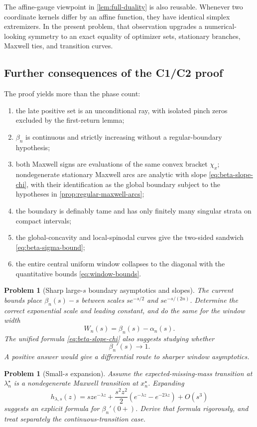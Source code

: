 \documentclass[11pt]{article}
\theoremstyle{plain}
\newtheorem{problem}[theorem]{Problem}
\theoremstyle{definition}
\theoremstyle{remark}
\begin{document}
The affine-gauge viewpoint in \cref{lem:full-duality} is also reusable.  Whenever two coordinate kernels differ by an affine function, they have identical simplex extremizers.  In the present problem, that observation upgrades a numerical-looking symmetry to an exact equality of optimizer sets, stationary branches, Maxwell ties, and transition curves.

\subsection{Further consequences of the C1/C2 proof}

The proof yields more than the phase count:
\begin{enumerate}[label=\textup{(\roman*)}]
\item the late positive set is an unconditional ray, with isolated pinch zeros excluded by the first-return lemma;
\item \(\beta_n\) is continuous and strictly increasing without a regular-boundary hypothesis;
\item both Maxwell signs are evaluations of the same convex bracket \(\chi_x\); nondegenerate stationary Maxwell arcs are analytic with slope \eqref{eq:beta-slope-chi}, with their identification as the global boundary subject to the hypotheses in \cref{prop:regular-maxwell-arcs};
\item the boundary is definably tame and has only finitely many singular strata on compact intervals;
\item the global-concavity and local-spinodal curves give the two-sided sandwich \eqref{eq:beta-sigma-bound};
\item the entire central uniform window collapses to the diagonal with the quantitative bounds \eqref{eq:window-bounds}.
\end{enumerate}

\begin{problem}[Sharp large-\(s\) boundary asymptotics and slopes]
The current bounds place \(\beta_n(s)-s\) between scales \(s e^{-s/2}\) and \(s e^{-s/(2n)}\).  Determine the correct exponential scale and leading constant, and do the same for the window width
\[
W_n(s)=\beta_n(s)-\alpha_n(s).
\]
The unified formula \eqref{eq:beta-slope-chi} also suggests studying whether
\[
\beta_n'(s)\longrightarrow1.
\]
A positive answer would give a differential route to sharper window asymptotics.
\end{problem}

\begin{problem}[Small-\(s\) expansion]
Assume the expected-missing-mass transition at \(\lambda_n^\star\) is a nondegenerate Maxwell transition at \(x_n^\star\).  Expanding
\[
h_{\lambda,s}(z)
=sze^{-\lambda z}
+\frac{s^2z^2}{2}\left(e^{-\lambda z}-e^{-2\lambda z}\right)
+O(s^3)
\]
suggests an explicit formula for \(\beta_n'(0+)\).  Derive that formula rigorously, and treat separately the continuous-transition case.
\end{problem}
\end{document}
